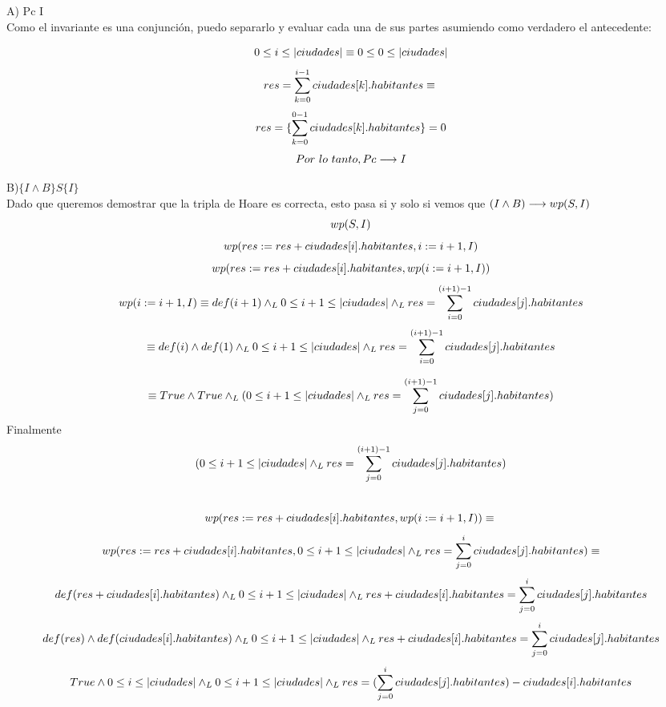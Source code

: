 \documentclass[10pt,a4paper]{article}
\begin{document}
\vspace{0.5cm}

A) Pc \implica I \vspace{0.2cm}\\
Como el invariante es una conjunción, puedo separarlo y evaluar cada una de sus partes asumiendo como verdadero el antecedente:

\[
0 \leq i \leq |ciudades| \equiv 0 \leq 0 \leq |ciudades| 
\vspace{0.2cm}
\]
\[
res =\sum\limits_{k=0}^{i-1}ciudades[k].habitantes \equiv
 \vspace{0.2cm}\\
\]
\[
res = \{\sum\limits_{k=0}^{0-1}ciudades[k].habitantes\} = 0 
\vspace{0.5cm}\\
\]
\[
Por \ lo \ tanto, Pc \implica I 
\vspace{0.5cm}\\
\]

B)$\{I \land B \} S \{I\}$ \vspace{0.2cm}\\

Dado que queremos demostrar que la tripla de Hoare es correcta, esto pasa si y solo si vemos que $(I \land B) \longrightarrow wp(S,I)$\\
\[wp(S,I)\\\]
\[wp(res := res + ciudades[i].habitantes, i := i+1, I)\\\]
\[wp(res := res + ciudades[i].habitantes, wp(i := i+1, I))\\ \\\]
\[wp (i := i+1, I) \equiv def(i+1) \land _L 0 \leq i+1 \leq |ciudades| \land _L res = \sum\limits_{i=0}^{(i+1)-1}ciudades[j].habitantes\\\]
\[\equiv def(i) \land def(1) \land _L 0\leq i+1 \leq |ciudades| \land _L res =\sum\limits_{i=0}^{(i+1)-1}ciudades[j].habitantes  \]

\[\equiv True\land True \land _L (0 \leq i+1 \leq |ciudades| \land _L res = \sum\limits_{j=0}^{(i+1)-1}ciudades[j].habitantes)\\ \]
\hspace{1cm}Finalmente
\[ (0 \leq i+1 \leq |ciudades| \land _L res = \sum\limits_{j=0}^{(i+1)-1}ciudades[j].habitantes)\\ \]
\\

\[wp(res := res + ciudades[i].habitantes, wp(i := i+1, I)) \equiv \\\]
\[wp(res := res + ciudades[i].habitantes, 0 \leq i +1\leq |ciudades| \land _L res = {\sum\limits_{j=0}^{i}ciudades[j].habitantes}) \equiv \]
\[def(res+ciudades[i].habitantes) \land _L 0 \leq i+1 \leq |ciudades| \land _L res +ciudades[i].habitantes = {\sum\limits_{j=0}^{i}ciudades[j].habitantes}\]
\[def(res) \land def(ciudades[i].habitantes) \land _L 0 \leq i+1 \leq |ciudades| \land _L res+ciudades[i].habitantes = {\sum\limits_{j=0}^{i}ciudades[j].habitantes}\]
\[True \land 0 \leq i \leq |ciudades| \land _L 0 \leq i+1 \leq |ciudades| \land _L res = ({\sum\limits_{j=0}^{i}ciudades[j].habitantes})-ciudades[i].habitantes\]
\end{document}

